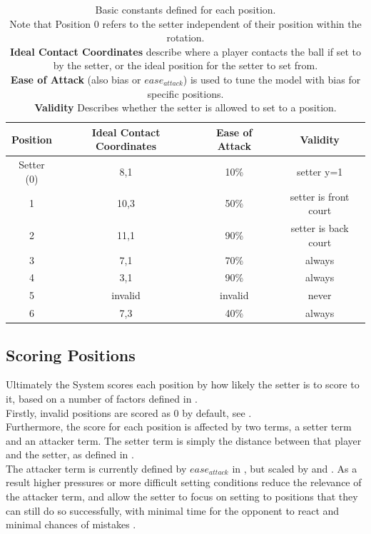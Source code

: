 \documentclass[main.tex]{subfiles}
\begin{document}
      \begin{table}[h!]
        \centering
        \caption{Basic constants defined for each position. \\
          Note that Position 0 refers to the setter independent of their position within the rotation. \\
          \textbf{Ideal Contact Coordinates} describe where a player contacts the ball if set to by the setter, or the ideal position for the setter to set from. \\
          \textbf{Ease of Attack} (also bias or \(ease_{attack}\)) is used to tune the model with bias for specific positions. \\
          \textbf{Validity} Describes whether the setter is allowed to set to a position. 
        }
        \small
        \begin{tabular}{ c | c c c }
          \hline
          Position  & Ideal Contact Coordinates & Ease of Attack & Validity \\ \hline \hline
          Setter (0) &  8,1 & 10\% & setter y=1 \\
          1 & 10,3 & 50\% & setter is front court \\
          2 & 11,1 & 90\% & setter is back court \\
          3 & 7,1 & 70\% &  always \\
          4 & 3,1 & 90\% & always \\
          5 & invalid & invalid & never\\
          6 & 7,3 & 40\% & always \\
          \hline 
        \end{tabular}
        \label{tab:positions}
        \normalsize
      \end{table}
      
    \subsection{Scoring Positions}
      
      Ultimately the System scores each position by how likely the setter is to score to it, based on a number of factors defined in .\\
      Firstly, invalid positions are scored as 0 by default, see . \\
      Furthermore, the score for each position is affected by two terms, a setter term and an attacker term. The setter term is simply the distance between that player and the setter, as defined in . \\
      The attacker term is currently defined by \(ease_{attack}\) in , but scaled by  and . As a result higher pressures or more difficult setting conditions reduce the relevance of the attacker term, and allow the setter to focus on setting to positions that they can still do so successfully, with minimal time for the opponent to react and minimal chances of mistakes \cite{idealSetter}.
      
\end{document}
